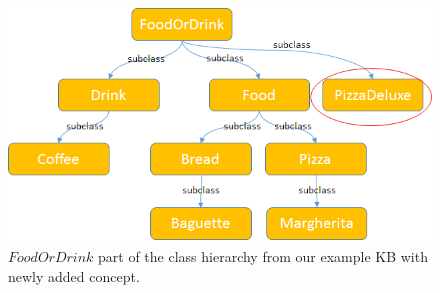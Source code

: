 \begin{figure}[H]
	\centering
		\includegraphics[width=1\textwidth]{figures/kbPosition.png}
	\caption{$FoodOrDrink$ part of the class hierarchy from our example KB with
    newly added concept.}
	\label{fig:kbPosition}
\end{figure}

